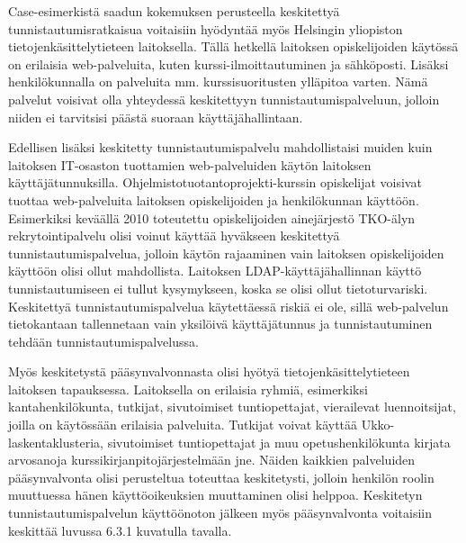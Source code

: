 Case-esimerkistä saadun kokemuksen perusteella keskitettyä tunnistautumisratkaisua voitaisiin hyödyntää myös Helsingin yliopiston tietojenkäsittelytieteen laitoksella. Tällä hetkellä laitoksen opiskelijoiden käytössä on erilaisia web-palveluita, kuten kurssi-ilmoittautuminen ja sähköposti. Lisäksi henkilökunnalla on palveluita mm. kurssisuoritusten ylläpitoa varten. Nämä palvelut voisivat olla yhteydessä keskitettyyn tunnistautumispalveluun, jolloin niiden ei tarvitsisi päästä suoraan käyttäjähallintaan.

Edellisen lisäksi keskitetty tunnistautumispalvelu mahdollistaisi muiden kuin laitoksen IT-osaston tuottamien web-palveluiden käytön laitoksen käyttäjätunnuksilla. Ohjelmistotuotantoprojekti-kurssin opiskelijat voisivat tuottaa web-palveluita laitoksen opiskelijoiden ja henkilökunnan käyttöön. Esimerkiksi keväällä 2010 toteutettu opiskelijoiden ainejärjestö TKO-älyn rekrytointipalvelu olisi voinut käyttää hyväkseen keskitettyä tunnistautumispalvelua, jolloin käytön rajaaminen vain laitoksen opiskelijoiden käyttöön olisi ollut mahdollista. Laitoksen LDAP-käyt\-tä\-jä\-hal\-lin\-nan käyttö tunnistautumiseen ei tullut kysymykseen, koska se olisi ollut tietoturvariski. Keskitettyä tunnistautumispalvelua käytettäessä riskiä ei ole, sillä web-palvelun tietokantaan tallennetaan vain yksilöivä käyttäjätunnus ja tunnistautuminen tehdään tunnistautumispalvelussa.

Myös keskitetystä pääsynvalvonnasta olisi hyötyä tietojenkäsittelytieteen laitoksen tapauksessa. Laitoksella on erilaisia ryhmiä, esimerkiksi kantahenkilökunta, tutkijat, sivutoimiset tuntiopettajat, vierailevat luennoitsijat, joilla on käytössään erilaisia palveluita. Tutkijat voivat käyttää Ukko-laskentaklusteria, sivutoimiset tuntiopettajat ja muu opetushenkilökunta kirjata arvosanoja kurssikirjanpitojärjestelmään jne. Näiden kaikkien palveluiden pääsynvalvonta olisi perusteltua toteuttaa keskitetysti, jolloin henkilön roolin muuttuessa hänen käyttöoikeuksien muuttaminen olisi helppoa. Keskitetyn tunnistautumispalvelun käyttöönoton jälkeen myös pääsynvalvonta voitaisiin keskittää luvussa 6.3.1 kuvatulla tavalla.